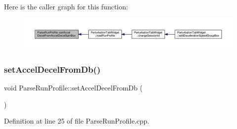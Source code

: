 Here is the caller graph for this function\+:
\nopagebreak
\begin{figure}[H]
\begin{center}
\leavevmode
\includegraphics[width=350pt]{class_parse_run_profile_aabc8065fa18e650ba1ed9eebd4c87938_icgraph}
\end{center}
\end{figure}
\mbox{\label{class_parse_run_profile_abd04ee7860c35aa5a87442c67ad38452}} 
\subsubsection{\texorpdfstring{set\+Accel\+Decel\+From\+Db()}{setAccelDecelFromDb()}}
{\footnotesize\ttfamily void Parse\+Run\+Profile\+::set\+Accel\+Decel\+From\+Db (\begin{DoxyParamCaption}{ }\end{DoxyParamCaption})}



Definition at line 25 of file Parse\+Run\+Profile.\+cpp.

